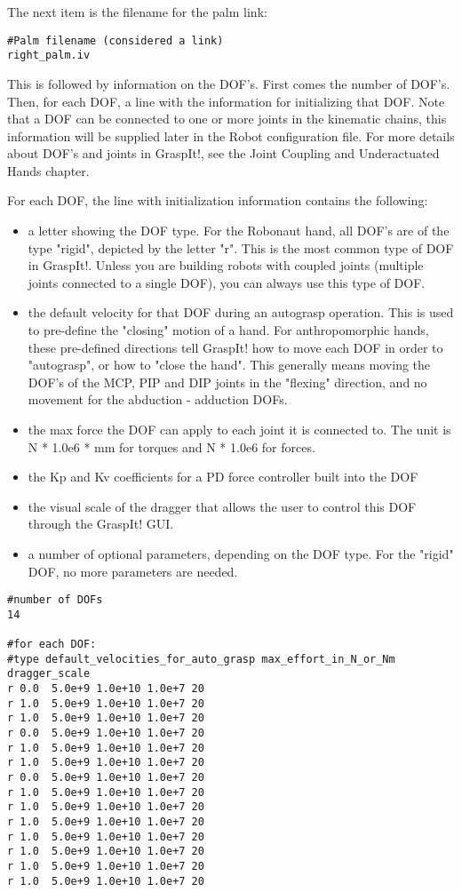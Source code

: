 The next item is the filename for the palm link:

\begin{verbatim}
#Palm filename (considered a link)
right_palm.iv
\end{verbatim}

This is followed by information on the DOF's. First comes the number
of DOF's. Then, for each DOF, a line with the information for
initializing that DOF. Note that a DOF can be connected to one or more
joints in the kinematic chains, this information will be supplied
later in the Robot configuration file. For more details about DOF's
and joints in GraspIt!, see the Joint Coupling and Underactuated Hands
chapter.

For each DOF, the line with initialization information contains the following:
\begin{itemize}
\item a letter showing the DOF type. For the Robonaut hand, all DOF's
  are of the type "rigid", depicted by the letter "r". This is the
  most common type of DOF in GraspIt!. Unless you are building robots
  with coupled joints (multiple joints connected to a single DOF), you
  can always use this type of DOF.
\item the default velocity for that DOF during an autograsp
  operation. This is used to pre-define the "closing" motion of a
  hand. For anthropomorphic hands, these pre-defined directions tell
  GraspIt! how to move each DOF in order to "autograsp", or how to
  "close the hand". This generally means moving the DOF's of the MCP,
  PIP and DIP joints in the "flexing" direction, and no movement for
  the abduction - adduction DOFs.
\item the max force the DOF can apply to each joint it is connected
  to. The unit is N * 1.0e6 * mm for torques and N * 1.0e6 for forces.
\item the Kp and Kv coefficients for a PD force controller built into
  the DOF
\item the visual scale of the dragger that allows the user to control
  this DOF through the GraspIt! GUI.
\item a number of optional parameters, depending on the DOF type. For
  the "rigid" DOF, no more parameters are needed.
\end{itemize}

\begin{verbatim}
#number of DOFs
14

#for each DOF:
#type default_velocities_for_auto_grasp max_effort_in_N_or_Nm dragger_scale
r 0.0  5.0e+9 1.0e+10 1.0e+7 20
r 1.0  5.0e+9 1.0e+10 1.0e+7 20
r 1.0  5.0e+9 1.0e+10 1.0e+7 20
r 0.0  5.0e+9 1.0e+10 1.0e+7 20
r 1.0  5.0e+9 1.0e+10 1.0e+7 20
r 1.0  5.0e+9 1.0e+10 1.0e+7 20
r 0.0  5.0e+9 1.0e+10 1.0e+7 20
r 1.0  5.0e+9 1.0e+10 1.0e+7 20
r 1.0  5.0e+9 1.0e+10 1.0e+7 20
r 1.0  5.0e+9 1.0e+10 1.0e+7 20
r 1.0  5.0e+9 1.0e+10 1.0e+7 20
r 1.0  5.0e+9 1.0e+10 1.0e+7 20
r 1.0  5.0e+9 1.0e+10 1.0e+7 20
r 1.0  5.0e+9 1.0e+10 1.0e+7 20
\end{verbatim}

